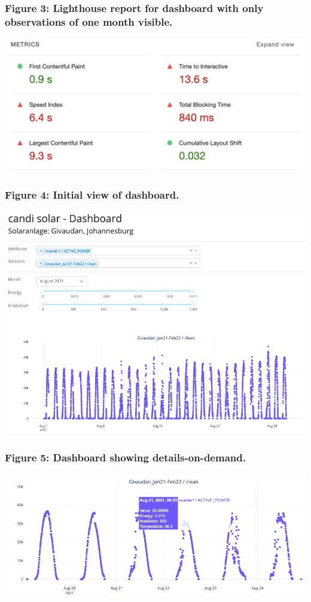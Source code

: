 \documentclass[11pt]{article}
\begin{document}
\subsubsection{Figure 3: Lighthouse report for dashboard with only observations of one month visible.}
\includegraphics{./lighthouse-2.png}

\subsubsection{Figure 4: Initial view of dashboard.}
\includegraphics{./dashboard.png}

\subsubsection{Figure 5: Dashboard showing details-on-demand.}
\includegraphics{./dashboard-details.png}
\end{document}
